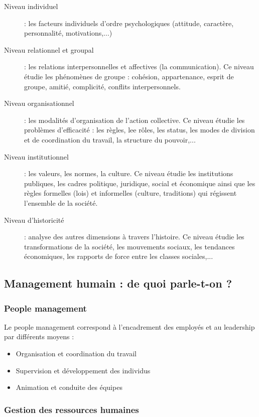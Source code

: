 \documentclass[12pt]{article}
\begin{document}
  \begin{description}
   \item[Niveau individuel] : les facteurs individuels d'ordre psychologiques (attitude, caractère, personnalité, motivations,...)
   \item[Niveau relationnel et groupal] : les relations interpersonnelles et affectives (la communication). Ce niveau étudie les phénomènes de groupe : cohésion, appartenance, esprit de groupe, amitié, complicité, conflits interpersonnels.
   \item[Niveau organisationnel] : les modalités d'organisation de l'action collective. Ce niveau étudie les problèmes d'efficacité : les règles, lee rôles, les status, les modes de division et de coordination du travail, la structure du pouvoir,... 
   \item[Niveau institutionnel] : les valeurs, les normes, la culture. Ce niveau étudie les institutions publiques, les cadres politique, juridique, social et économique ainsi que les règles formelles (lois) et informelles (culture, traditions) qui régissent l'ensemble de la société.
   \item[Niveau d'historicité] : analyse des autres dimensions à travers l'histoire. Ce niveau étudie les transformations de la société, les mouvements sociaux, les tendances économiques, les rapports de force entre les classes sociales,...
  \end{description}
  \subsection{Management humain : de quoi parle-t-on ?}
    \subsubsection{People management}
      Le people management correspond à l'encadrement des employés et au leadership par différents moyens :
      
      \begin{itemize}
       \item Organisation et coordination du travail
       \item Supervision et développement des individus
       \item Animation et conduite des équipes
      \end{itemize}
    
    \subsubsection{Gestion des ressources humaines}
      
\end{document}
